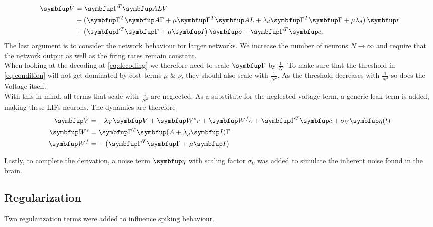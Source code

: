 \begin{equation}\label{eq:voltage_limit}
\begin{aligned}
	\bmu{\dot{V}} &= \bmu{\Gamma}^T\bmu{ALV}\\
	 &+ \left(\bmu{\Gamma}^T\bmu{A\Gamma} + \mu\bmu{\Gamma}^T \bmu{AL}+\lambda_d\bmu{\Gamma}^T\bmu{\Gamma} + \mu\lambda_d\right)\bmu{r}\\
	 &+\left(\bmu{\Gamma}^T\bmu{\Gamma} + \mu\bmu{I}\right)\bmu{o} + \bmu{\Gamma}^T\bmu{c}.
\end{aligned}
\end{equation}
The last argument is to consider the network behaviour for larger networks. We increase the number of neurons $N\longrightarrow\infty$ and require that the network output as well as the firing rates remain constant.\\
When looking at the decoding at \cref{eq:decoding} we therefore need to scale $\bmu{\Gamma}$ by $\frac{1}{N}$. To make sure that the threshold in \cref{eq:condition} will not get dominated by cost terms $\mu$ \& $\nu$, they should also scale with $\frac{1}{N^2}$. As the threshold decreases with $\frac{1}{N^2}$ so does the Voltage itself.\\
With this in mind, all terms that scale with $\frac{1}{N^2}$ are neglected. As a substitute for the neglected voltage term, a generic leak term is added, making these \acp{LIF} neurons. The dynamics are therefore
\begin{equation}\label{eq:simple_sim}
\begin{aligned}
	\bmu{\dot{V}} &= -\lambda_V \bmu{V} + \bmu{W^sr} + \bmu{W^fo} + \bmu{\Gamma}^T \bmu{c} + \sigma_V\bmu{\eta}(t)\\
	\bmu{W^s} &= \bmu{\Gamma}^T\bmu{(A+\lambda}_d\bmu{I)\Gamma}\\
	\bmu{W^f} & = -\left(\bmu{\Gamma}^T\bmu{\Gamma} + \mu\bmu{I}\right)
\end{aligned}
\end{equation}

Lastly, to complete the derivation, a noise term $\bmu{\eta}$ with scaling factor $\sigma_V$ was added to simulate the inherent noise found in the brain.

\subsection{Regularization}\label{sssection:regularization}

Two regularization terms were added to influence spiking behaviour.

